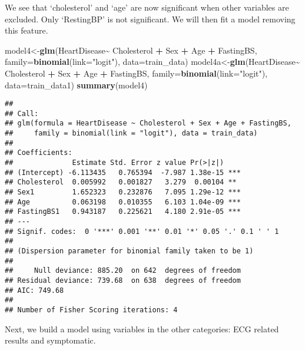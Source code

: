 \documentclass[
]{article}
\newenvironment{Shaded}{\begin{snugshade}}{\end{snugshade}}
\newcommand{\AttributeTok}[1]{\textcolor[rgb]{0.13,0.29,0.53}{#1}}
\newcommand{\FunctionTok}[1]{\textcolor[rgb]{0.13,0.29,0.53}{\textbf{#1}}}
\newcommand{\NormalTok}[1]{#1}
\newcommand{\OtherTok}[1]{\textcolor[rgb]{0.56,0.35,0.01}{#1}}
\newcommand{\SpecialCharTok}[1]{\textcolor[rgb]{0.81,0.36,0.00}{\textbf{#1}}}
\newcommand{\StringTok}[1]{\textcolor[rgb]{0.31,0.60,0.02}{#1}}
\begin{document}
We see that `cholesterol' and `age' are now significant when other
variables are excluded. Only `RestingBP' is not significant. We will
then fit a model removing this feature.

\begin{Shaded}
\begin{Highlighting}[]
\NormalTok{model4}\OtherTok{\textless{}{-}}\FunctionTok{glm}\NormalTok{(HeartDisease}\SpecialCharTok{\textasciitilde{}}\NormalTok{ Cholesterol }\SpecialCharTok{+}\NormalTok{ Sex }\SpecialCharTok{+}  
\NormalTok{              Age }\SpecialCharTok{+}\NormalTok{ FastingBS, }\AttributeTok{family=}\FunctionTok{binomial}\NormalTok{(}\AttributeTok{link=}\StringTok{"logit"}\NormalTok{), }\AttributeTok{data=}\NormalTok{train\_data)}
\NormalTok{model4a}\OtherTok{\textless{}{-}}\FunctionTok{glm}\NormalTok{(HeartDisease}\SpecialCharTok{\textasciitilde{}}\NormalTok{ Cholesterol }\SpecialCharTok{+}\NormalTok{ Sex }\SpecialCharTok{+} 
\NormalTok{               Age }\SpecialCharTok{+}\NormalTok{ FastingBS, }\AttributeTok{family=}\FunctionTok{binomial}\NormalTok{(}\AttributeTok{link=}\StringTok{"logit"}\NormalTok{), }\AttributeTok{data=}\NormalTok{train\_data1)}
\FunctionTok{summary}\NormalTok{(model4)}
\end{Highlighting}
\end{Shaded}

\begin{verbatim}
## 
## Call:
## glm(formula = HeartDisease ~ Cholesterol + Sex + Age + FastingBS, 
##     family = binomial(link = "logit"), data = train_data)
## 
## Coefficients:
##              Estimate Std. Error z value Pr(>|z|)    
## (Intercept) -6.113435   0.765394  -7.987 1.38e-15 ***
## Cholesterol  0.005992   0.001827   3.279  0.00104 ** 
## Sex1         1.652323   0.232876   7.095 1.29e-12 ***
## Age          0.063198   0.010355   6.103 1.04e-09 ***
## FastingBS1   0.943187   0.225621   4.180 2.91e-05 ***
## ---
## Signif. codes:  0 '***' 0.001 '**' 0.01 '*' 0.05 '.' 0.1 ' ' 1
## 
## (Dispersion parameter for binomial family taken to be 1)
## 
##     Null deviance: 885.20  on 642  degrees of freedom
## Residual deviance: 739.68  on 638  degrees of freedom
## AIC: 749.68
## 
## Number of Fisher Scoring iterations: 4
\end{verbatim}

Next, we build a model using variables in the other categories: ECG
related results and symptomatic.
\end{document}
